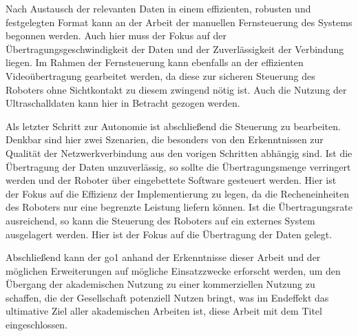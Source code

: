 Nach Austausch der relevanten Daten in einem effizienten, robusten und festgelegten Format kann an der Arbeit der manuellen
Fernsteuerung des Systems begonnen werden.
Auch hier muss der Fokus auf der Übertragungsgeschwindigkeit der Daten und der Zuverlässigkeit der Verbindung liegen.
Im Rahmen der Fernsteuerung kann ebenfalls an der effizienten Videoübertragung gearbeitet werden, da diese zur sicheren Steuerung
des Roboters ohne Sichtkontakt zu diesem zwingend nötig ist.
Auch die Nutzung der Ultraschalldaten kann hier in Betracht gezogen werden.

Als letzter Schritt zur Autonomie ist abschließend die Steuerung zu bearbeiten.
Denkbar sind hier zwei Szenarien, die besonders von den Erkenntnissen zur Qualität der Netzwerkverbindung aus den
vorigen Schritten abhängig sind.
Ist die Übertragung der Daten unzuverlässig, so sollte die Übertragungsmenge verringert werden und der Roboter
über eingebettete Software gesteuert werden.
Hier ist der Fokus auf die Effizienz der Implementierung zu legen, da die Recheneinheiten des Roboters nur
eine begrenzte Leistung liefern können.
Ist die Übertragungsrate ausreichend, so kann die Steuerung des Roboters auf ein externes System ausgelagert
werden.
Hier ist der Fokus auf die Übertragung der Daten gelegt.

Abschließend kann der \gls{go1} anhand der Erkenntnisse dieser Arbeit und der möglichen Erweiterungen auf
mögliche Einsatzzwecke erforscht werden, um den Übergang der akademischen Nutzung zu einer kommerziellen Nutzung
zu schaffen, die der Gesellschaft potenziell Nutzen bringt, was im Endeffekt das ultimative Ziel aller akademischen Arbeiten
ist, diese Arbeit mit dem Titel \emph{\mytitle} eingeschlossen.


